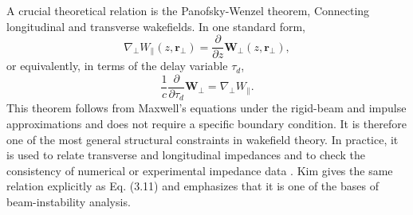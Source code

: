 \documentclass[11pt,a4paper]{article}
\begin{document}
\begin{sloppypar}
A crucial theoretical relation is the Panofsky-Wenzel theorem, Connecting longitudinal and transverse wakefields. In one standard form,
\begin{equation}
\nabla_{\perp} W_{\parallel}(z,\mathbf r_{\perp})
=
\frac{\partial}{\partial z}\mathbf W_{\perp}(z,\mathbf r_{\perp}),
\label{eq:PW}
\end{equation}
or equivalently, in terms of the delay variable $\tau_d$,
\begin{equation}
\frac{1}{c}\frac{\partial}{\partial \tau_d}\mathbf W_{\perp}
=
\nabla_{\perp}W_{\parallel}.
\label{eq:PW_tau}
\end{equation}
This theorem follows from Maxwell’s equations under the rigid-beam and impulse approximations and does not require a specific boundary condition. It is therefore one of the most general structural constraints in wakefield theory. In practice, it is used to relate transverse and longitudinal impedances and to check the consistency of numerical or experimental impedance data \cite{metral_wake_2021-1}. Kim \cite{kim_mbtrack2_cuda_2025} gives the same relation explicitly as Eq. (3.11) and emphasizes that it is one of the bases of beam-instability analysis. 


\end{sloppypar}
\end{document}
